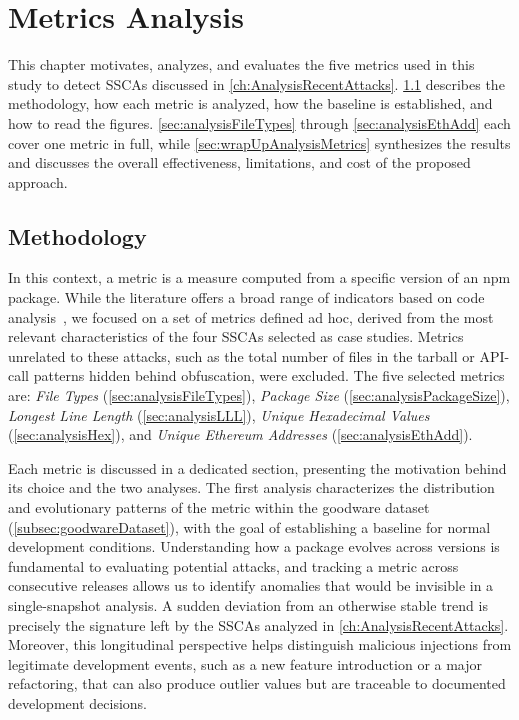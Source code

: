 \chapter{Metrics Analysis}
\label{ch:metricsAnalysis}

This chapter motivates, analyzes, and evaluates the five metrics used in this study to detect \acp{SSCA} discussed in \cref{ch:AnalysisRecentAttacks}.
\cref{sec:metricsMethodology} describes the methodology, 
how each metric is analyzed, how the baseline is established, and how to read the figures.
\cref{sec:analysisFileTypes} through \cref{sec:analysisEthAdd}
each cover one metric in full, while \cref{sec:wrapUpAnalysisMetrics} synthesizes the results and discusses the overall effectiveness, 
limitations, and cost of the proposed approach.

\section{Methodology}
\label{sec:metricsMethodology}

In this context, a metric is a measure computed from a specific version of an \ac{npm} package.
While the literature offers a broad range of indicators based on code analysis~\cite{zoratti2025valutazione, weissberg2025llm},
we focused on a set of metrics defined ad hoc, derived from the most relevant characteristics of the four \acp{SSCA} selected as case studies.
Metrics unrelated to these attacks, such as the total number of files in the tarball or \ac{API}-call patterns hidden behind obfuscation, were excluded.
The five selected metrics are: 
\emph{File Types} (\cref{sec:analysisFileTypes}),
\emph{Package Size} (\cref{sec:analysisPackageSize}),
\emph{Longest Line Length} (\cref{sec:analysisLLL}),
\emph{Unique Hexadecimal Values} (\cref{sec:analysisHex}),
and \emph{Unique Ethereum Addresses} (\cref{sec:analysisEthAdd}).

Each metric is discussed in a dedicated section, presenting the motivation behind its choice and the two analyses.
The first analysis characterizes the distribution and evolutionary patterns of the metric within the goodware dataset (\cref{subsec:goodwareDataset}),
with the goal of establishing a baseline for normal development conditions.
Understanding how a package evolves across versions is fundamental to evaluating potential attacks,
and tracking a metric across consecutive releases allows us to identify anomalies that would be invisible in a single-snapshot analysis. 
A sudden deviation from an otherwise stable trend is precisely the signature left by the \acp{SSCA} analyzed in \cref{ch:AnalysisRecentAttacks}.
Moreover, this longitudinal perspective helps distinguish malicious injections from legitimate development events, 
such as a new feature introduction or a major refactoring, 
that can also produce outlier values but are traceable to documented development decisions.

